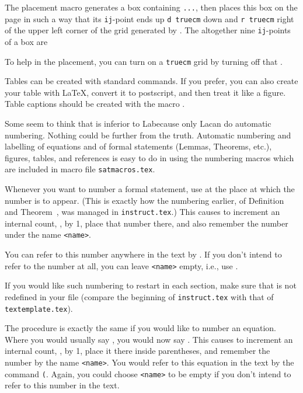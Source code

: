 The placement macro  generates a box
containing {\tt...}, then places this box on the page in such a way that its
{\tt ij}-point ends up {\tt d truecm} down and {\tt r truecm} right of the
upper left corner of the grid generated by . The altogether nine
{\tt ij}-points of a box are
\smallskip\centerline{\vbox{\tt{}}}
\smallskip To help in the placement, you can turn on a {\tt truecm} grid by
turning off that .

 Tables can be created with standard \Tex commands.
If you prefer, you can also create your table with La\TeX, convert
it to postscript, and then treat it like a figure. Table captions
should be created with the macro .

 Some seem to
think that \Tex is inferior to La\Tex because only La\Tex can do
automatic numbering.  Nothing could be further from the truth.
Automatic numbering and labelling of equations and of formal statements
(Lemmas, Theorems, etc.), figures, tables, and references is easy
to do in \Tex using the numbering macros which are included in
macro file {\tt satmacros.tex}.

Whenever you want to number a formal statement, use
 at the place at which the number is to appear.
(This is exactly how the numbering earlier, of Definition~
and Theorem~, was managed in {\tt instruct.tex}.)
This causes \Tex to increment an internal count, , by 1, place
that number there, and also remember the number under the name {\tt<name>}.

You can refer to this number anywhere in the text by
. If you don't intend to refer to the number at
all, you can leave {\tt<name>} empty, i.e., use
.

If you would like such numbering to restart in each section, make sure that
 is not redefined  in your \Tex file (compare the beginning of
{\tt instruct.tex} with that of {\tt textemplate.tex}).

The procedure is exactly the same if you would like to number an equation.
Where you would usually say , you would now say
. This causes \Tex to increment an internal count,
, by 1, place it there inside parentheses, and remember the number
by the name {\tt<name>}.
 You would refer to this equation in the text by
the command
{\tt(}. Again, you could choose {\tt<name>} to
be empty if you don't intend to refer to this number in the text.

